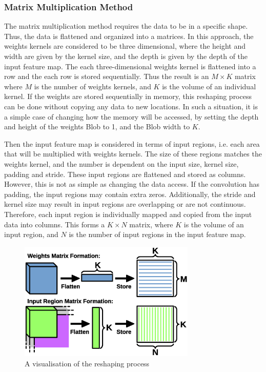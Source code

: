 \documentclass[12pt]{article}
\begin{document}
\subsubsection{Matrix Multiplication Method}
\label{sec:Design-Conv-MM}

The matrix multiplication method requires the data to be in a specific shape. Thus, the data is flattened and organized into a matrices. In this approach, the weights kernels are considered to be three dimensional, where the height and width are given by the kernel size, and the depth is given by the depth of the input feature map. The each three-dimensional weights kernel is flattened into a row and the each row is stored sequentially. Thus the result is an $M \times K$ matrix where $M$ is the number of weights kernels, and $K$ is the volume of an individual kernel. If the weights are stored sequentially in memory, this reshaping process can be done without copying any data to new locations. In such a situation, it is a simple case of changing how the memory will be accessed, by setting the depth and height of the weights Blob to 1, and the Blob width to $K$.

Then the input feature map is considered in terms of input regions, i.e. each area that will be multiplied with weights kernels. The size of these regions matches the weights kernel, and the number is dependent on the input size, kernel size, padding and stride.  These input regions are flattened and stored as columns. However, this is not as simple as changing the data access. If the convolution has padding, the input regions may contain extra zeros. Additionally, the stride and kernel size may result in input regions are overlapping or are not continuous. Therefore, each input region is individually mapped and copied from the input data into columns. This forms a $K \times N$ matrix, where $K$ is the volume of an input region, and $N$ is the number of input regions in the input feature map.

\begin{figure} [H]
\centering
\includegraphics[width=0.75\textwidth]{figures/im2col.eps}
\caption{A visualisation of the reshaping process} 
\label{fig:im2col}
\end{figure}
\end{document}
